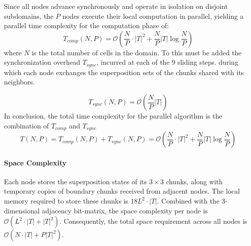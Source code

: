Since all nodes advance synchronously and operate in isolation on disjoint
subdomains, the $P$ nodes execute their local computation in parallel, yielding
a parallel time complexity for the computation phase of:
\[
T_{comp}(N,P)=\mathcal{O}\left(\frac NP \cdot |T|^2 + \frac NP|T| \log \frac NP\right)
\]
where $N$ is the total number of cells in the domain. To this must be added
the synchronization overhead $T_{sync}$, incurred at each of the 9 sliding
steps. during which each node exchanges the superposition sets
of the chunks shared with its neighbors.

\[
    T_{sync}(N,P)=\mathcal{O}\left(\frac NP|T|\right)
\] 
In conclusion, the total time complexity for the parallel algorithm is the combination of $T_{comp}$ and $T_{sync}$
$$T(N,P)=T_{comp}(N,P)+T_{sync}(N,P)=\mathcal O\left(\frac NP \cdot |T|^2 + \frac NP |T|\log \frac NP\right)$$

\paragraph{Space Complexity}
Each node stores the superposition states of its $3 \times 3$ chunks, along with temporary copies of boundary chunks received from adjacent nodes. The local memory required to store these chunks is $18 L^2 \cdot |T|$. Combined with the 3-dimensional adjacency bit-matrix, the space complexity per node is $\mathcal{O}(L^2 \cdot |T|+|T|^2)$. Consequently, the total space requirement across all nodes is $\mathcal{O}(N \cdot |T|+P|T|^2)$.



        